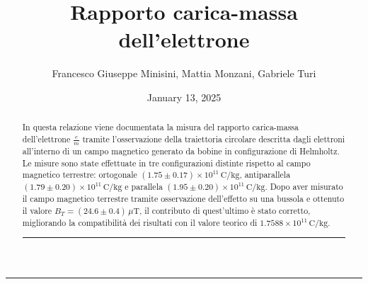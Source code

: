 \documentclass[a4paper,12pt]{article}
\title{Rapporto carica-massa dell'elettrone}
\author{Francesco Giuseppe Minisini, Mattia Monzani, Gabriele Turi}
\date{January 13, 2025}
\begin{document}
\maketitle
\hrule
\vspace{9pt}
\begin{abstract}
    \noindent
    In questa relazione viene documentata la misura del rapporto carica-massa dell'elettrone \(\frac{e}{m}\) tramite l'osservazione della traiettoria circolare descritta dagli elettroni all'interno di un campo magnetico generato da bobine in configurazione di Helmholtz. Le misure sono state effettuate in tre configurazioni distinte rispetto al campo magnetico terrestre: ortogonale \((1.75 \pm 0.17) \times 10^{11} \, \text{C/kg}\), antiparallela \((1.79 \pm 0.20) \times 10^{11} \, \text{C/kg}\) e parallela \((1.95 \pm 0.20) \times 10^{11} \, \text{C/kg}\). Dopo aver misurato il campo magnetico terrestre tramite osservazione dell'effetto su una bussola e ottenuto il valore \(B_T = (24.6 \pm 0.4) \, \mu\text{T}\), il contributo di quest'ultimo è stato corretto, migliorando la compatibilità dei risultati con il valore teorico di \(1.7588 \times 10^{11} \, \text{C/kg}\).
    
\vspace{20pt}
\hrule
\end{abstract}
\vspace{2 pt}
\end{document}
